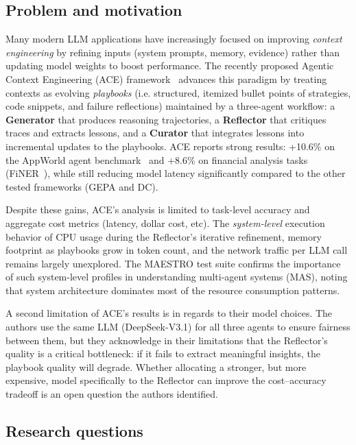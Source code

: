 \documentclass[letterpaper,twocolumn,10pt]{article}
\begin{document}
\subsection{Problem and motivation}

Many modern LLM applications have increasingly focused on improving \emph{context engineering} by refining inputs (system prompts, memory, evidence) rather than updating model weights to boost performance. The recently proposed Agentic Context Engineering (ACE) framework~\cite{zhang2025agenticcontextengineeringevolving} advances this paradigm by treating contexts as evolving \emph{playbooks} (i.e. structured, itemized bullet points of strategies, code snippets, and failure reflections) maintained by a three-agent workflow: a \textbf{Generator} that produces reasoning trajectories, a \textbf{Reflector} that critiques traces and extracts lessons, and a \textbf{Curator} that integrates lessons into incremental updates to the playbooks. ACE reports strong results: +10.6\% on the AppWorld agent benchmark~\cite{trivedi2024appworldcontrollableworldapps} and +8.6\% on financial analysis tasks (FiNER~\cite{Loukas_2022}), while still reducing model latency significantly compared to the other tested frameworks (GEPA and DC).

Despite these gains, ACE's analysis is limited to task-level accuracy and aggregate cost metrics (latency, dollar cost, etc). The \emph{system-level} execution behavior of CPU usage during the Reflector's iterative refinement, memory footprint as playbooks grow in token count, and the network traffic per LLM call remains largely unexplored. The MAESTRO test suite confirms the importance of such system-level profiles in understanding multi-agent systems (MAS), noting that system architecture dominates most of the resource consumption patterns.

A second limitation of ACE's results is in regards to their model choices. The authors use the same LLM (DeepSeek-V3.1) for all three agents to ensure fairness between them, but they acknowledge in their limitations that the Reflector's quality is a critical bottleneck: if it fails to extract meaningful insights, the playbook quality will degrade. Whether allocating a stronger, but more expensive, model specifically to the Reflector can improve the cost--accuracy tradeoff is an open question the authors identified.

\subsection{Research questions}
\end{document}
